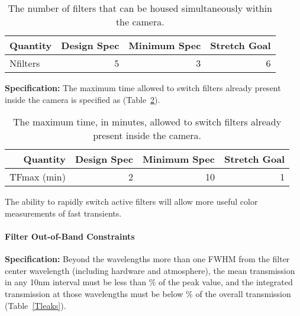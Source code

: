 \begin{table}[bh!]
\begin{tabular}{|l|r|r|r|}
\hline
Quantity        & Design Spec & Minimum Spec & Stretch Goal      \\
\hline
 Nfilters       &      5      &      3       &       6           \\
\hline
\end{tabular}
\caption{The number of filters that can be housed simultaneously within the
camera. }
\label{Tfilterchanges}
\end{table}


\newpage
{\bf Specification:} The maximum time allowed to switch filters already
present inside the camera is specified as
(Table~\ref{Tfilterswitch}).

\begin{table}[h]
\begin{tabular}{|r|r|r|r|}
\hline
     Quantity     & Design Spec & Minimum Spec  & Stretch Goal      \\
\hline
 TFmax (min)      &      2      &      10       &       1           \\
\hline
\end{tabular}
\caption{The maximum time, in minutes, allowed to switch filters already
present inside the camera.}
\label{Tfilterswitch}
\end{table}

The ability to rapidly switch active filters will allow more useful color
measurements of fast transients. 


\paragraph{Filter Out-of-Band Constraints\\}

{\bf Specification:} Beyond the wavelengths more than one FWHM from the filter
center wavelength (including hardware and atmosphere), the mean transmission
in any 10nm interval must be less than
\% of the peak value, and the integrated transmission at those wavelengths
must be below
\% of the overall transmission (Table~\ref{Tleaks}).

